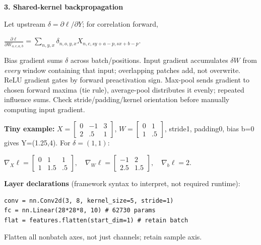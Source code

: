 \documentclass[a4paper]{article}
\newcommand{\key}[1]{\textbf{#1}}
\newcommand{\Topic}[1]{\par\vspace{1.7pt}\noindent
  {\fontsize{7.7}{8.0}\selectfont\bfseries #1}\par\vspace{0.3pt}}
\newcommand{\eq}[1]{\par\noindent\mbox{\(\displaystyle #1\)}\par}
\newcommand{\smat}[1]{\left[\begin{smallmatrix}#1\end{smallmatrix}\right]}
\newcounter{sheet}
\newcounter{sheetcolumn}
\newlength{\colwidth}
\newenvironment{sheetcol}[1][7.0]{\stepcounter{sheetcolumn}
  \begin{lrbox}{\columnbox}\begin{minipage}[t]{\colwidth}\vspace{0pt}
  \fontsize{#1}{\dimexpr#1pt+0.6pt\relax}\selectfont}
  {\end{minipage}\end{lrbox}
  \typeout{CV1COL|\thesheet|\thesheetcolumn|\the\dimexpr\ht\columnbox+\dp\columnbox\relax}
  \usebox{\columnbox}\ignorespacesafterend}
\newcommand{\Sep}{\hfill}
\begin{document}
\begin{sheetcol}
\Topic{3. Shared-kernel backpropagation}
Let upstream \(\delta=\partial\ell/\partial Y\); for correlation forward,
\eq{\frac{\partial\ell}{\partial W_{o,c,a,b}}
 =\sum_{n,y,x}\delta_{n,o,y,x}X_{n,c,sy+a-p,sx+b-p}.}
Bias gradient sums \(\delta\) across batch/positions. Input gradient accumulates \(\delta W\) from \emph{every} window containing that input; overlapping patches add, not overwrite. ReLU gradient gates by forward preactivation sign. Max-pool sends gradient to chosen forward maxima (tie rule), average-pool distributes it evenly; repeated influence sums. Check stride/padding/kernel orientation before manually computing input gradient.

\key{Tiny example:} \(X=\smat{0&-1&3\\2&.5&1}\), \(W=\smat{0&1\\1&.5}\), stride1, padding0, bias b=0 gives Y=(1.25,4). For \(\delta=(1,1)\):
\eq{\nabla_X\ell=\smat{0&1&1\\1&1.5&.5},\quad
 \nabla_W\ell=\smat{-1&2\\2.5&1.5},\quad \nabla_b\ell=2.}

\key{Layer declarations} (framework syntax to interpret, not required runtime):
\begin{lstlisting}
conv = nn.Conv2d(3, 8, kernel_size=5, stride=1)
fc = nn.Linear(28*28*8, 10) # 62730 params
flat = features.flatten(start_dim=1) # retain batch
\end{lstlisting}
Flatten all nonbatch axes, not just channels; retain sample axis.
\end{sheetcol}\Sep
\end{document}
